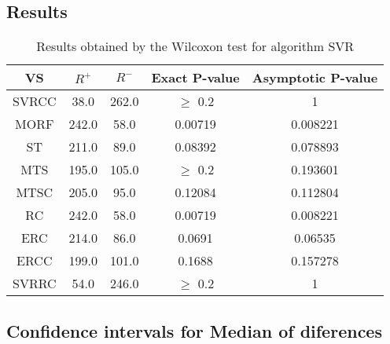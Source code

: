 \documentclass[a4paper,10pt]{article}
\begin{document}
\subsection{Results}

\begin{table}[!htp]
\centering\small
\begin{tabular}{
|c|c|c|c|c|}
\hline
 VS & $R^{+}$ & $R^{-}$ & Exact P-value & Asymptotic P-value \\ \hline 
SVRCC & 38.0 & 262.0 & $\geq$ 0.2 & 1\\ \hline 
MORF & 242.0 & 58.0 & 0.00719 & 0.008221\\ \hline 
ST & 211.0 & 89.0 & 0.08392 & 0.078893\\ \hline 
MTS & 195.0 & 105.0 & $\geq$ 0.2 & 0.193601\\ \hline 
MTSC & 205.0 & 95.0 & 0.12084 & 0.112804\\ \hline 
RC & 242.0 & 58.0 & 0.00719 & 0.008221\\ \hline 
ERC & 214.0 & 86.0 & 0.0691 & 0.06535\\ \hline 
ERCC & 199.0 & 101.0 & 0.1688 & 0.157278\\ \hline 
SVRRC & 54.0 & 246.0 & $\geq$ 0.2 & 1\\ \hline 

\end{tabular}
\caption{Results obtained by the Wilcoxon test for algorithm SVR}
\end{table}

\subsection{Confidence intervals for Median of diferences}
\end{document}

